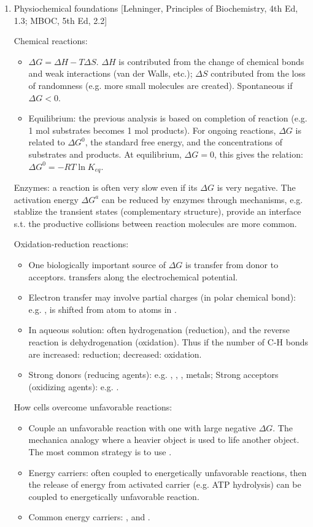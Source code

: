 \documentclass{report}
\begin{document}
\begin{enumerate}
\item{Physiochemical foundations} [Lehninger, Principles of Biochemistry, 4th Ed, 1.3; MBOC, 5th Ed, 2.2] 

Chemical reactions: 
\begin{itemize}
	\item $\Delta G = \Delta H - T \Delta S$. $\Delta H$ is contributed from the change of chemical bonds and weak interactions (van der Walls, etc.); $\Delta S$ contributed from the loss of randomness (e.g. more small molecules are created). Spontaneous if $\Delta G < 0$.
	\item Equilibrium: the previous analysis is based on completion of reaction (e.g. 1 mol substrates becomes 1 mol products). For ongoing reactions, $\Delta G$ is related to $\Delta G^0$, the standard free energy, and the concentrations of substrates and products. At equilibrium, $\Delta G = 0$, this gives the relation: $\Delta G^0 = -RT \ln K_{eq}$. 
\end{itemize}

Enzymes: a reaction is often very slow even if its $\Delta G$ is very negative. The activation energy $\Delta G^a$ can be reduced by enzymes through mechanisms, e.g. stablize the transient states (complementary structure), provide an interface s.t. the productive collisions between reaction molecules are more common. 

Oxidation-reduction reactions: 
\begin{itemize}
	\item One biologically important source of $\Delta G$ is  transfer from donor to acceptors.  transfers along the electrochemical potential. 
	\item Electron transfer may involve partial charges (in polar chemical bond): e.g. ,  is shifted from  atom to  atoms in . 
	\item In aqueous solution: often hydrogenation (reduction),  and the reverse reaction is dehydrogenation (oxidation). Thus if the number of C-H bonds are increased: reduction; decreased: oxidation. 
	\item Strong  donors (reducing agents): e.g. , , , metals; Strong  acceptors (oxidizing agents): e.g. . 
\end{itemize}

How cells overcome unfavorable reactions: 
\begin{itemize}
	\item Couple an unfavorable reaction with one with large negative $\Delta G$. The mechanica analogy where a heavier object is used to life another object. The most common strategy is to use . 
	\item Energy carriers: often coupled to energetically unfavorable reactions, then the release of energy from activated carrier (e.g. ATP hydrolysis) can be coupled to energetically unfavorable reaction. 
	\item Common energy carriers: ,  and . 
\end{itemize}


\end{enumerate}
\end{document}
